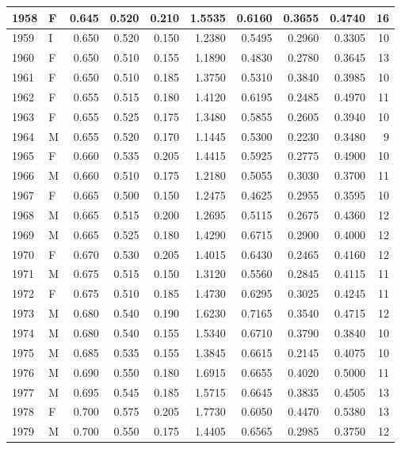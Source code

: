 \documentclass[9pt,twocolumn,twoside,]{pnas-new}
\begin{document}
\begin{tabular}{l|l|r|r|r|r|r|r|r|r}
\hline
1958 & F & 0.645 & 0.520 & 0.210 & 1.5535 & 0.6160 & 0.3655 & 0.4740 & 16\\
\hline
1959 & I & 0.650 & 0.520 & 0.150 & 1.2380 & 0.5495 & 0.2960 & 0.3305 & 10\\
\hline
1960 & F & 0.650 & 0.510 & 0.155 & 1.1890 & 0.4830 & 0.2780 & 0.3645 & 13\\
\hline
1961 & F & 0.650 & 0.510 & 0.185 & 1.3750 & 0.5310 & 0.3840 & 0.3985 & 10\\
\hline
1962 & F & 0.655 & 0.515 & 0.180 & 1.4120 & 0.6195 & 0.2485 & 0.4970 & 11\\
\hline
1963 & F & 0.655 & 0.525 & 0.175 & 1.3480 & 0.5855 & 0.2605 & 0.3940 & 10\\
\hline
1964 & M & 0.655 & 0.520 & 0.170 & 1.1445 & 0.5300 & 0.2230 & 0.3480 & 9\\
\hline
1965 & F & 0.660 & 0.535 & 0.205 & 1.4415 & 0.5925 & 0.2775 & 0.4900 & 10\\
\hline
1966 & M & 0.660 & 0.510 & 0.175 & 1.2180 & 0.5055 & 0.3030 & 0.3700 & 11\\
\hline
1967 & F & 0.665 & 0.500 & 0.150 & 1.2475 & 0.4625 & 0.2955 & 0.3595 & 10\\
\hline
1968 & M & 0.665 & 0.515 & 0.200 & 1.2695 & 0.5115 & 0.2675 & 0.4360 & 12\\
\hline
1969 & M & 0.665 & 0.525 & 0.180 & 1.4290 & 0.6715 & 0.2900 & 0.4000 & 12\\
\hline
1970 & F & 0.670 & 0.530 & 0.205 & 1.4015 & 0.6430 & 0.2465 & 0.4160 & 12\\
\hline
1971 & M & 0.675 & 0.515 & 0.150 & 1.3120 & 0.5560 & 0.2845 & 0.4115 & 11\\
\hline
1972 & F & 0.675 & 0.510 & 0.185 & 1.4730 & 0.6295 & 0.3025 & 0.4245 & 11\\
\hline
1973 & M & 0.680 & 0.540 & 0.190 & 1.6230 & 0.7165 & 0.3540 & 0.4715 & 12\\
\hline
1974 & M & 0.680 & 0.540 & 0.155 & 1.5340 & 0.6710 & 0.3790 & 0.3840 & 10\\
\hline
1975 & M & 0.685 & 0.535 & 0.155 & 1.3845 & 0.6615 & 0.2145 & 0.4075 & 10\\
\hline
1976 & M & 0.690 & 0.550 & 0.180 & 1.6915 & 0.6655 & 0.4020 & 0.5000 & 11\\
\hline
1977 & M & 0.695 & 0.545 & 0.185 & 1.5715 & 0.6645 & 0.3835 & 0.4505 & 13\\
\hline
1978 & F & 0.700 & 0.575 & 0.205 & 1.7730 & 0.6050 & 0.4470 & 0.5380 & 13\\
\hline
1979 & M & 0.700 & 0.550 & 0.175 & 1.4405 & 0.6565 & 0.2985 & 0.3750 & 12\\

\end{tabular}
\end{document}
